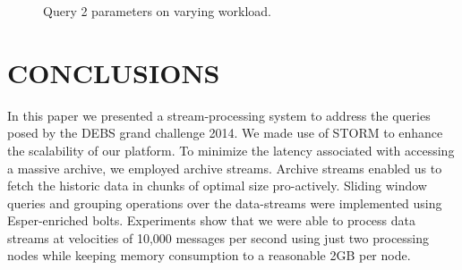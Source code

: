 \documentclass{sig-alternate}
\begin{document}
\begin{figure}[h]
\caption{Query 2 parameters on varying workload.} \label{fig:q2-workload} 
\end{figure}





\section{CONCLUSIONS}
\label{sec:conclusion}

In this paper we presented a stream-processing system to address the queries posed by the DEBS grand challenge 2014. We made use of STORM to enhance the scalability of our platform. To minimize the latency associated with accessing a massive archive, we employed archive streams. Archive streams enabled us to fetch the historic data in chunks of optimal size pro-actively. Sliding window queries and grouping operations over the data-streams were implemented using Esper-enriched bolts. Experiments show that we were able to process data streams at velocities of 10,000 messages per second using just two processing nodes while keeping memory consumption to a reasonable 2GB per node.


%

 
\end{document}
